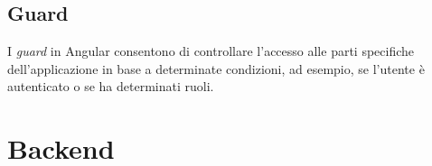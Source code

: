 

\subsection{Guard}

I \textit{guard} in Angular consentono di controllare l'accesso alle parti specifiche dell'applicazione in base a determinate condizioni, ad esempio, se l'utente è autenticato o se ha determinati ruoli.



\section{Backend}